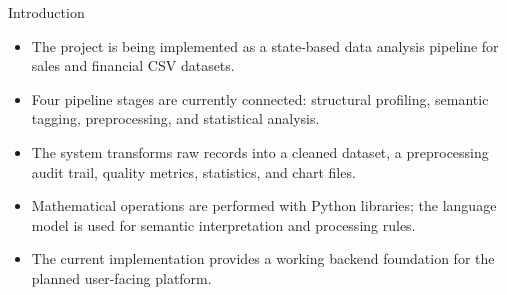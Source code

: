 
\begin{frame}{Introduction}
    \begin{itemize}
        \item The project is being implemented as a state-based data analysis pipeline for sales and financial CSV datasets.
        \item Four pipeline stages are currently connected: structural profiling, semantic tagging, preprocessing, and statistical analysis.
        \item The system transforms raw records into a cleaned dataset, a preprocessing audit trail, quality metrics, statistics, and chart files.
        \item Mathematical operations are performed with Python libraries; the language model is used for semantic interpretation and processing rules.
        \item The current implementation provides a working backend foundation for the planned user-facing platform.
    \end{itemize}
\end{frame}
